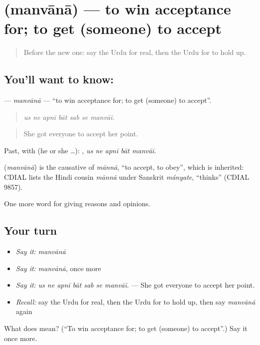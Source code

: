 \section[\texorpdfstring{\ur{منوانا} (manvānā)}{منوانا (manvānā)}]{ (manvānā) — to win acceptance for; to get (someone) to accept}

\label{lesson:UR-C353-manvana}



\begin{quote}
Before the new one: say the Urdu for real, then the Urdu for to hold up.
\end{quote}

\subsection*{You'll want to know: }
\textbf{} — \emph{manvānā} — \textquotedblleft{}to win acceptance for; to get (someone) to accept\textquotedblright{}.

\begin{quote}
      
\end{quote}

\begin{quote}
\emph{us ne apnī bāt sab se manvāī.}
\end{quote}

\begin{quote}
She got everyone to accept her point.
\end{quote}

Past, with  (he or she …):     , \emph{us ne apnī bāt manvāī}.

\begin{cousinweb}
\textbf{} (\emph{manvānā}) is the causative of \emph{mānnā}, \textquotedblleft{}to accept, to obey\textquotedblright{}, which is inherited: CDIAL lists the Hindi cousin \emph{mānnā} under Sanskrit \emph{mányate}, \textquotedblleft{}thinks\textquotedblright{} (CDIAL 9857).
\end{cousinweb}

\begin{grammarlens}[title={What you've built}]
One more word for giving reasons and opinions.
\end{grammarlens}

\subsection*{Your turn}
\begin{itemize}
\raggedright
  \item \emph{Say it:} \emph{manvānā}
  \item \emph{Say it:} \emph{manvānā}, once more
  \item \emph{Say it:} \emph{us ne apnī bāt sab se manvāī.} — She got everyone to accept her point.
  \item \emph{Recall:} say the Urdu for real, then the Urdu for to hold up, then say \emph{manvānā} again
\end{itemize}

\begin{tcolorbox}[breakable,colback=teal!4,colframe=teal!35!black,title={Before you move on}]
What does  mean? (\textquotedblleft{}To win acceptance for; to get (someone) to accept\textquotedblright{}.) Say it once more.
\end{tcolorbox}
